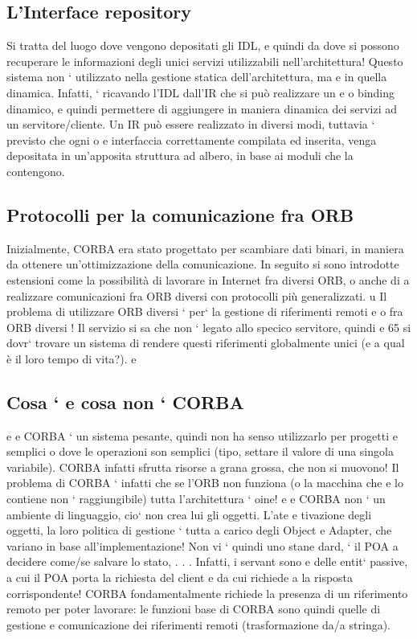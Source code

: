 \documentclass[a4paper,12pt]{article}
\begin{document}
\subsection{L'Interface repository}
Si tratta del luogo dove vengono depositati gli IDL, e quindi da dove si possono
recuperare le informazioni degli unici servizi utilizzabili nell'architettura!
Questo sistema non ` utilizzato nella gestione statica dell'architettura, ma
e
in quella dinamica. Infatti, ` ricavando l'IDL dall'IR che si può realizzare un
e
o
binding dinamico, e quindi permettere di aggiungere in maniera dinamica dei
servizi ad un servitore/cliente.
Un IR può essere realizzato in diversi modi, tuttavia ` previsto che ogni
o
e
interfaccia correttamente compilata ed inserita, venga depositata in un'apposita
struttura ad albero, in base ai moduli che la contengono.
\subsection{Protocolli per la comunicazione fra ORB}
Inizialmente, CORBA era stato progettato per scambiare dati binari, in maniera
da ottenere un'ottimizzazione della comunicazione. In seguito si sono introdotte
estensioni come la possibilità di lavorare in Internet fra diversi ORB, o anche di
a
realizzare comunicazioni fra ORB diversi con protocolli più generalizzati.
u
Il problema di utilizzare ORB diversi ` per` la gestione di riferimenti remoti
e
o
fra ORB diversi ! Il servizio si sa che non ` legato allo specico servitore, quindi
e
65
si dovr` trovare un sistema di rendere questi riferimenti globalmente unici (e
a
qual è il loro tempo di vita?).
e
\subsection{Cosa ` e cosa non ` CORBA}
e
e
CORBA ` un sistema pesante, quindi non ha senso utilizzarlo per progetti
e
semplici o dove le operazioni son semplici (tipo, settare il valore di una singola
variabile). CORBA infatti sfrutta risorse a grana grossa, che non si muovono!
Il problema di CORBA ` infatti che se l'ORB non funziona (o la macchina che
e
lo contiene non ` raggiungibile) tutta l'architettura ` oine!
e
e
CORBA non ` un ambiente di linguaggio, cio` non crea lui gli oggetti. L'ate
e
tivazione degli oggetti, la loro politica di gestione ` tutta a carico degli Object
e
Adapter, che variano in base all'implementazione! Non vi ` quindi uno stane
dard, ` il POA a decidere come/se salvare lo stato, . . . Infatti, i servant sono
e
delle entit` passive, a cui il POA porta la richiesta del client e da cui richiede
a
la risposta corrispondente!
CORBA fondamentalmente richiede la presenza di un riferimento remoto
per poter lavorare: le funzioni base di CORBA sono quindi quelle di gestione e
comunicazione dei riferimenti remoti (trasformazione da/a stringa).
\end{document}
